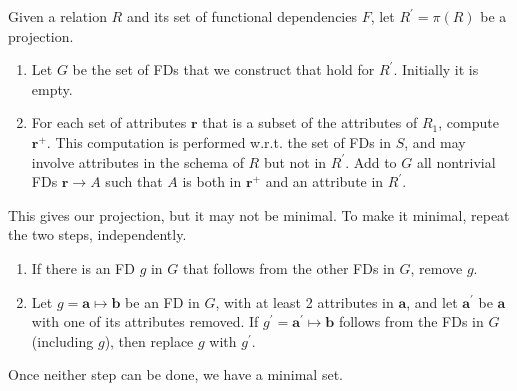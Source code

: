 \documentclass{article}
\begin{document}
      \begin{theorem}
        Given a relation $R$ and its set of functional dependencies $F$, let $R^\prime = \pi(R)$ be a projection. 
        \begin{enumerate}
          \item Let $G$ be the set of FDs that we construct that hold for $R^\prime$. Initially it is empty. 
          \item For each set of attributes $\mathbf{r}$ that is a subset of the attributes of $R_1$, compute $\mathbf{r}^+$. This computation is performed w.r.t. the set of FDs in $S$, and may involve attributes in the schema of $R$ but not in $R^\prime$. Add to $G$ all nontrivial FDs $\mathbf{r} \rightarrow A$ such that $A$ is both in $\mathbf{r}^+$ and an attribute in $R^\prime$. 
        \end{enumerate}
        This gives our projection, but it may not be minimal. To make it minimal, repeat the two steps, independently. 
        \begin{enumerate}
          \item If there is an FD $g$ in $G$ that follows from the other FDs in $G$, remove $g$. 
          \item Let $g = \mathbf{a} \mapsto \mathbf{b} $ be an FD in $G$, with at least 2 attributes in $\mathbf{a}$, and let $\mathbf{a}^\prime$ be $\mathbf{a}$ with one of its attributes removed. If $g^\prime = \mathbf{a}^\prime \mapsto \mathbf{b}$ follows from the FDs in $G$ (including $g$), then replace $g$ with $g^\prime$. 
        \end{enumerate}
        Once neither step can be done, we have a minimal set. 
      \end{theorem}
\end{document}
